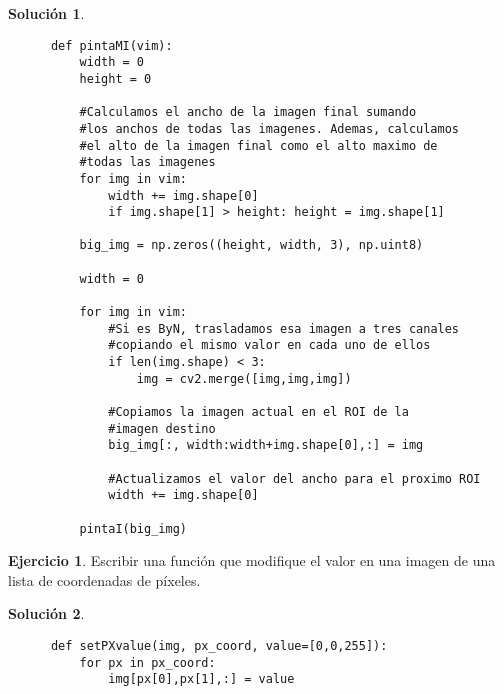 \documentclass[a4paper, 11pt]{article}
\theoremstyle{definition}
\newtheorem{ejercicio}{Ejercicio}
\newtheorem*{solucion}{Solución}
\begin{document}
  \begin{solucion}
      \leavevmode
      \begin{lstlisting}
      def pintaMI(vim):
          width = 0
          height = 0

          #Calculamos el ancho de la imagen final sumando
          #los anchos de todas las imagenes. Ademas, calculamos
          #el alto de la imagen final como el alto maximo de
          #todas las imagenes
          for img in vim:
              width += img.shape[0]
              if img.shape[1] > height: height = img.shape[1]

          big_img = np.zeros((height, width, 3), np.uint8)

          width = 0

          for img in vim:
              #Si es ByN, trasladamos esa imagen a tres canales
              #copiando el mismo valor en cada uno de ellos
              if len(img.shape) < 3:
                  img = cv2.merge([img,img,img])

              #Copiamos la imagen actual en el ROI de la
              #imagen destino
              big_img[:, width:width+img.shape[0],:] = img

              #Actualizamos el valor del ancho para el proximo ROI
              width += img.shape[0]

          pintaI(big_img)
      \end{lstlisting}
  \end{solucion}

  \begin{ejercicio}
      Escribir una función que modifique el valor en una imagen de una lista de coordenadas de píxeles.
  \end{ejercicio}

  \begin{solucion}
      \leavevmode
      \begin{lstlisting}
      def setPXvalue(img, px_coord, value=[0,0,255]):
          for px in px_coord:
              img[px[0],px[1],:] = value
      \end{lstlisting}
  \end{solucion}

  \newpage
\end{document}
